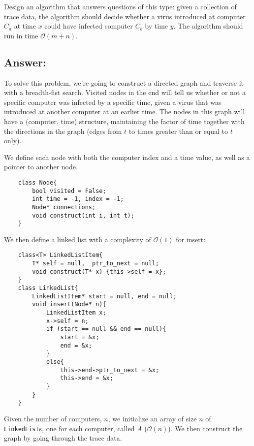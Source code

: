 \documentclass[12pt, letterpaper]{article}
\begin{document}
Design an algorithm that answers questions of this type: given a collection of trace data, the algorithm should decide whether a virus introduced at computer $C_a$ at time $x$ could have infected computer $C_b$ by time $y$. The algorithm should run in time $\mathcal{O}(m + n)$.

\clearpage
\subsection*{Answer:}

To solve this problem, we're going to construct a directed graph and traverse it with a breadth-fist search. Visited nodes in the end will tell us whether or not a specific computer was infected by a specific time, given a virus that was introduced at another computer at an earlier time.
The nodes in this graph will have a (computer, time) structure, maintaining the factor of time together with the directions in the graph (edges from $t$ to times greater than or equal to $t$ only).

We define each node with both the computer index and a time value, as well as a pointer to another node.
\begin{verbatim}
    class Node{
        bool visited = False;
        int time = -1, index = -1;
        Node* connections;
        void construct(int i, int t);
    }
\end{verbatim}
We then define a linked list with a complexity of $\mathcal{O}(1)$ for insert:
\begin{verbatim}
    class<T> LinkedListItem{
        T* self = null,  ptr_to_next = null;
        void construct(T* x) {this->self = x};
    }
    class LinkedList{
        LinkedListItem* start = null, end = null;
        void insert(Node* n){
            LinkedListItem x;
            x->self = n;
            if (start == null && end == null){
                start = &x;
                end = &x;
            }
            else{
                this->end->ptr_to_next = &x;
                this->end = &x;
            }
        }
    }
\end{verbatim}
Given the number of computers, $n$, we initialize an array of size $n$ of \verb|LinkedList|s, one for each computer, called $A$ ($\mathcal{O}(n)$).
We then construct the graph by going through the trace data.
\end{document}
